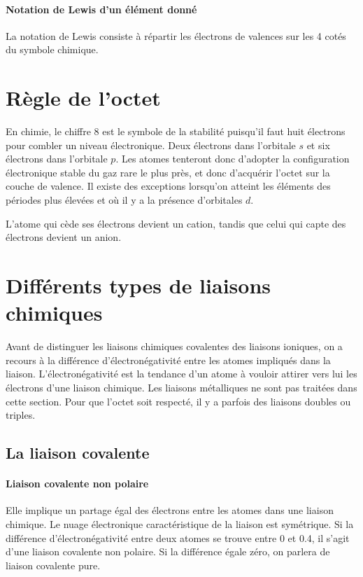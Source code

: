 \paragraph{Notation de Lewis d'un élément donné}
La notation de Lewis consiste à répartir les électrons 
de valences sur les 4 cotés du symbole chimique.

\section{Règle de l'octet}
En chimie, le chiffre 8 est le symbole de la stabilité puisqu'il faut huit électrons pour combler un niveau électronique.
Deux électrons dans l'orbitale $s$ et six électrons dans l'orbitale $p$.
Les atomes tenteront donc d'adopter la configuration électronique stable du gaz rare le plus près, et donc d'acquérir l'octet sur la couche de valence.
Il existe des exceptions lorsqu'on atteint les éléments des périodes plus élevées et où il y a la présence d'orbitales $d$.

L'atome qui cède ses électrons devient un cation,
tandis que celui qui capte des électrons devient un anion.

\section{Différents types de liaisons chimiques}
Avant de distinguer les liaisons chimiques covalentes des liaisons ioniques, on a recours à la différence d'électronégativité entre les atomes impliqués dans la liaison.
L'électronégativité est la tendance d'un atome à vouloir attirer vers lui les électrons d'une liaison chimique.
Les liaisons métalliques ne sont pas traitées dans cette section.
Pour que l'octet soit respecté, il y a parfois des liaisons doubles ou triples.

\subsection{La liaison covalente}

\paragraph{Liaison covalente non polaire} Elle implique un partage égal des électrons entre les atomes dans une liaison chimique.
Le nuage électronique caractéristique de la liaison est symétrique.
Si la différence d'électronégativité entre deux atomes se trouve entre 0 et 0.4, il s'agit d'une liaison covalente non polaire.
Si la différence égale zéro, on parlera de liaison covalente pure.

